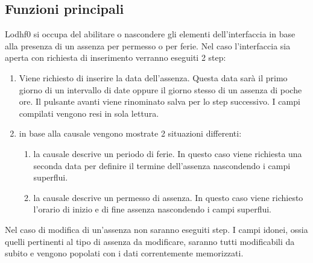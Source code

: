 \documentclass[target=bach,aauheader=,style=]{thud}
\begin{document}
\subsection{Funzioni principali}
Lodhf0 si occupa del abilitare o nascondere gli elementi dell'interfaccia in base alla presenza di un assenza per permesso o per ferie.
Nel caso l'interfaccia sia aperta con richiesta di inserimento verranno eseguiti 2 step:
\begin{enumerate}
    \item Viene richiesto di inserire la data dell'assenza. Questa data sarà il primo giorno di un intervallo di date oppure il giorno stesso di un assenza di poche ore. Il pulsante avanti viene rinominato salva per lo step successivo. I campi compilati vengono resi in sola lettura.
    \item in base alla causale vengono mostrate 2 situazioni differenti:
    \begin{enumerate}
            \item la causale descrive un periodo di ferie. In questo caso viene richiesta una seconda data per definire il termine dell'assenza nascondendo i campi superflui.
            \item la causale descrive un permesso di assenza. In questo caso viene richiesto l'orario di inizio e di fine assenza nascondendo i campi superflui. 
    \end{enumerate}
\end{enumerate}

Nel caso di modifica di un'assenza non saranno eseguiti step. I campi idonei, ossia quelli pertinenti al tipo di assenza da modificare, saranno tutti modificabili da subito e vengono popolati con i dati correntemente memorizzati.
\end{document}
